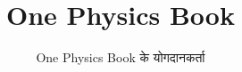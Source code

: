 \documentclass[11pt,a4paper,twoside,openany]{book}
\title{One Physics Book}
\author{One Physics Book के योगदानकर्ता}
\date{\bookdate}
\begin{document}
\frontmatter




\tableofcontents

\mainmatter



\appendix
\part{\omsolutionspart}


\backmatter
\printindex
\end{document}
